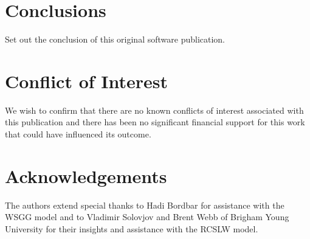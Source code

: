 \documentclass[preprint,12pt, a4paper]{elsarticle}
\begin{document}

\section{Conclusions}
\label{}

Set out the conclusion of this original software publication.

\section{Conflict of Interest}
%

We wish to confirm that there are no known conflicts of interest associated with this publication and there has been no significant financial support for this work that could have influenced its outcome.


\section*{Acknowledgements}
\label{}

The authors extend special thanks to Hadi Bordbar for assistance with the WSGG model and to Vladimir Solovjov and Brent Webb of Brigham Young University for their insights and assistance with the RCSLW model. 
\end{document}

